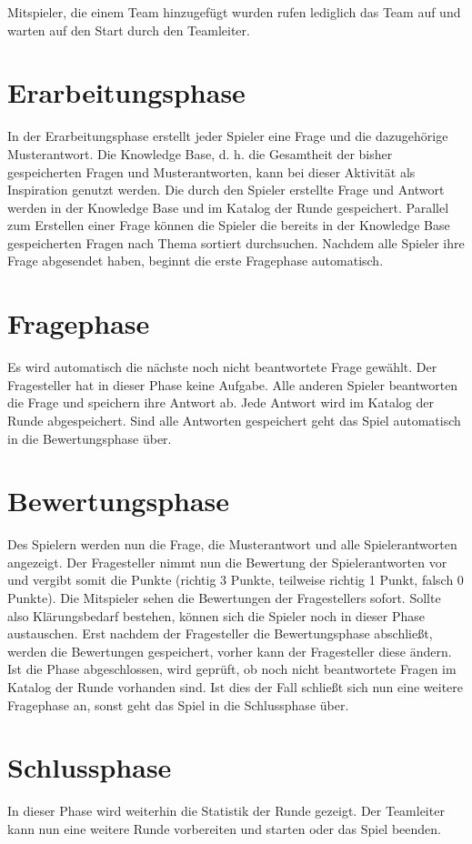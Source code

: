 \documentclass[a4paper,11pt,listof=numbered,glossary=totoc,parskip=half,toc=bib]{scrreprt}
\begin{document}
	Mitspieler, die einem Team hinzugefügt wurden rufen lediglich das Team auf und warten auf den Start durch den Teamleiter.
	
	\section{Erarbeitungsphase}
	In der Erarbeitungsphase erstellt jeder Spieler eine Frage und die dazugehörige Musterantwort. Die
Knowledge Base, d. h. die Gesamtheit der bisher gespeicherten Fragen und Musterantworten, kann
bei dieser Aktivität als Inspiration genutzt werden. Die durch den Spieler erstellte Frage und Antwort
werden in der Knowledge Base und im Katalog der Runde gespeichert. 
Parallel zum Erstellen einer Frage können die Spieler die bereits in der Knowledge Base gespeicherten Fragen nach Thema sortiert durchsuchen.
Nachdem alle Spieler ihre Frage abgesendet haben, beginnt die erste Fragephase automatisch.

	\section{Fragephase}
	Es wird automatisch die nächste noch nicht beantwortete Frage gewählt. Der Fragesteller hat in dieser Phase keine Aufgabe. Alle anderen Spieler beantworten die Frage und speichern ihre Antwort ab. Jede Antwort wird im Katalog der Runde abgespeichert. Sind alle Antworten gespeichert geht das Spiel automatisch in die Bewertungsphase über.
	
	\section{Bewertungsphase}
	Des Spielern werden nun die Frage, die Musterantwort und alle Spielerantworten angezeigt. Der Fragesteller nimmt nun die Bewertung der Spielerantworten vor und vergibt somit die Punkte (richtig 3 Punkte, teilweise richtig 1 Punkt, falsch 0 Punkte). Die Mitspieler sehen die Bewertungen der Fragestellers sofort. Sollte also Klärungsbedarf bestehen, können sich die Spieler noch in dieser Phase austauschen. Erst nachdem der Fragesteller die Bewertungsphase abschließt, werden die Bewertungen gespeichert, vorher kann der Fragesteller diese ändern. Ist die Phase abgeschlossen, wird geprüft, ob noch nicht beantwortete Fragen im Katalog der Runde vorhanden sind. Ist dies der Fall schließt sich nun eine weitere Fragephase an, sonst geht das Spiel in die Schlussphase über.
	
	\section{Schlussphase}
	In dieser Phase wird weiterhin die Statistik der Runde gezeigt. Der Teamleiter kann nun eine weitere Runde vorbereiten und starten oder das Spiel beenden.
	
\end{document}
